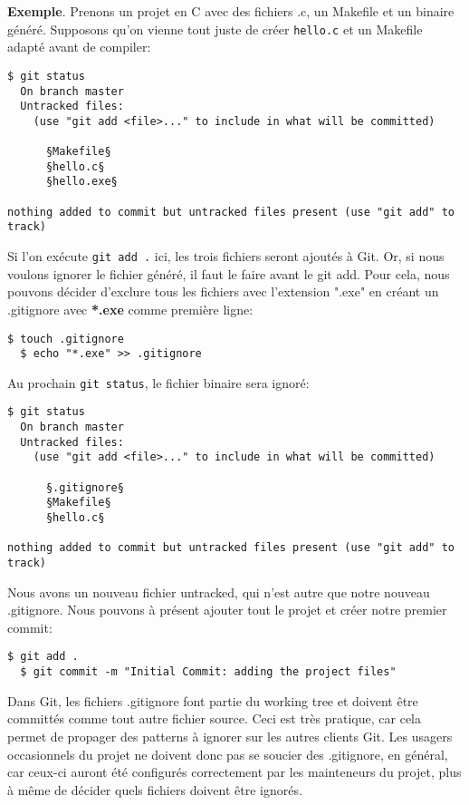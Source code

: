 \documentclass{../../common/tufte-latex/tufte-handout}
\begin{document}
\noindent \textbf{Exemple}.
Prenons un projet en C avec des fichiers .c, un Makefile et un binaire généré.
Supposons qu'on vienne tout juste de créer \texttt{hello.c} et un Makefile adapté avant de compiler:

\begin{lstlisting}[style=BashInputStyle]
  $ git status
  On branch master
  Untracked files:
    (use "git add <file>..." to include in what will be committed)
  
      §Makefile§
      §hello.c§
      §hello.exe§

nothing added to commit but untracked files present (use "git add" to track)
\end{lstlisting}

Si l'on exécute \texttt{git add .} ici, les trois fichiers seront ajoutés à Git.
Or, si nous voulons ignorer le fichier généré, il faut le faire avant le git add. Pour cela, nous pouvons décider d'exclure tous les fichiers avec l'extension ".exe" en créant un .gitignore avec \textbf{*.exe} comme première ligne:

\begin{lstlisting}[style=BashInputStyle]
  $ touch .gitignore
  $ echo "*.exe" >> .gitignore
\end{lstlisting}

Au prochain \texttt{git status}, le fichier binaire sera ignoré:

\begin{lstlisting}[style=BashInputStyle]
  $ git status
  On branch master
  Untracked files:
    (use "git add <file>..." to include in what will be committed)
  
      §.gitignore§
      §Makefile§
      §hello.c§

nothing added to commit but untracked files present (use "git add" to track)
\end{lstlisting}

Nous avons un nouveau fichier untracked, qui n'est autre que notre nouveau .gitignore.
Nous pouvons à présent ajouter tout le projet et créer notre premier commit:

\begin{lstlisting}[style=BashInputStyle]
  $ git add .
  $ git commit -m "Initial Commit: adding the project files"
\end{lstlisting}

Dans Git, les fichiers .gitignore font partie du working tree et doivent être committés comme tout autre fichier source.
Ceci est très pratique, car cela permet de propager des patterns à ignorer sur les autres clients Git.
Les usagers occasionnels du projet ne doivent donc pas se soucier des .gitignore, en général, car ceux-ci auront été configurés correctement par les mainteneurs du projet, plus à même de décider quels fichiers doivent être ignorés.
\end{document}
